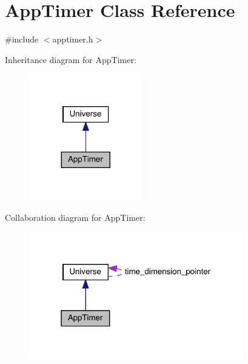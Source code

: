 \hypertarget{class_app_timer}{}\section{App\+Timer Class Reference}
\label{class_app_timer}


{\ttfamily \#include $<$apptimer.\+h$>$}



Inheritance diagram for App\+Timer\+:\nopagebreak
\begin{figure}[H]
\begin{center}
\leavevmode
\includegraphics[width=140pt]{class_app_timer__inherit__graph}
\end{center}
\end{figure}


Collaboration diagram for App\+Timer\+:
\nopagebreak
\begin{figure}[H]
\begin{center}
\leavevmode
\includegraphics[width=265pt]{class_app_timer__coll__graph}
\end{center}
\end{figure}
